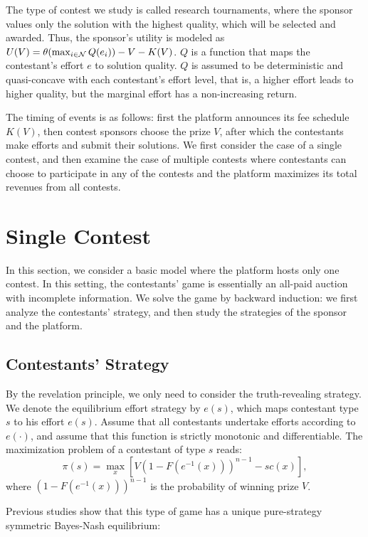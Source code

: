 \documentclass[12pt]{article}
\begin{document}
The type of contest we study is called research tournaments, where the sponsor values only the solution with the highest quality, which will be selected and awarded. Thus, the sponsor's utility is modeled as $U(V)=\theta(\max_{i \in \cal N}Q(e_i))-V-K(V)$. $Q$ is a function that maps the contestant's effort $e$ to solution quality.
$Q$ is assumed to be deterministic and quasi-concave with each contestant's
effort level, that is, a higher effort leads to higher quality, but
the marginal effort has a non-increasing return.

The timing of events is as follows: first the platform announces
its fee schedule $K(V)$, then contest sponsors choose the prize $V$,
after which the contestants make efforts and submit their solutions.
We first consider the case of a single contest, and then examine the
case of multiple contests where contestants can choose to participate
in any of the contests and the platform maximizes its total revenues
from all contests.


\section{Single Contest}

In this section, we consider a basic model where the platform hosts only one contest. In this setting, the contestants' game is essentially an all-paid auction with incomplete information. We solve the game by backward induction: we first analyze the contestants' strategy, and then study the strategies of the sponsor and the platform.


\subsection{Contestants' Strategy}

By the revelation principle, we only need to consider the truth-revealing
strategy. We denote the equilibrium effort strategy by $e(s)$, which
maps contestant type $s$ to his effort $e(s)$. Assume that all contestants
undertake efforts according to $e(\cdot)$, and assume that this function
is strictly monotonic and differentiable. The maximization problem
of a contestant of type $s$ reads:
\begin{equation}
\pi(s)=\max_{x}[V(1-F(e^{-1}(x)))^{n-1}-sc(x)],
\end{equation}
where $(1-F(e^{-1}(x)))^{n-1}$ is the probability of winning prize
$V$.

Previous studies \citep{Moldovanu:2001, Archak:2009} show that this
type of game has a unique pure-strategy symmetric Bayes-Nash equilibrium:
\end{document}

